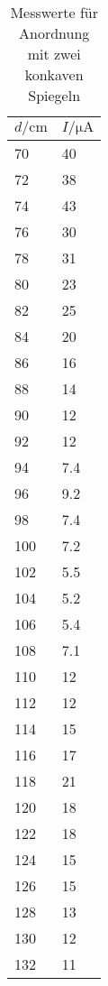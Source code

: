 \begin{table}[H]
  \centering
  \caption{Messwerte für Anordnung mit zwei konkaven Spiegeln}
  \label{tab:tabe1}
    \begin{tabular}{l l}
    \toprule
    $ d / \si{\centi\meter} $ & $ I / \si{\micro\ampere} $ \\
    \midrule
    70 & 40 \\
    72 & 38 \\
    74 & 43 \\
    76 & 30 \\
    78 & 31 \\
    80 & 23 \\
    82 & 25 \\
    84 & 20 \\
    86 & 16 \\
    88 & 14 \\
    90 & 12 \\
    92 & 12 \\
    94 & 7.4 \\
    96 & 9.2 \\
    98 & 7.4 \\
    100 & 7.2 \\
    102 & 5.5 \\
    104 & 5.2 \\
    106 & 5.4 \\
    108 & 7.1 \\
    110 & 12 \\
    112 & 12 \\
    114 & 15 \\
    116 & 17 \\
    118 & 21 \\
    120 & 18 \\
    122 & 18 \\
    124 & 15 \\
    126 & 15 \\
    128 & 13 \\
    130 & 12 \\
    132 & 11 \\



          \bottomrule
        \end{tabular}
    \end{table}
